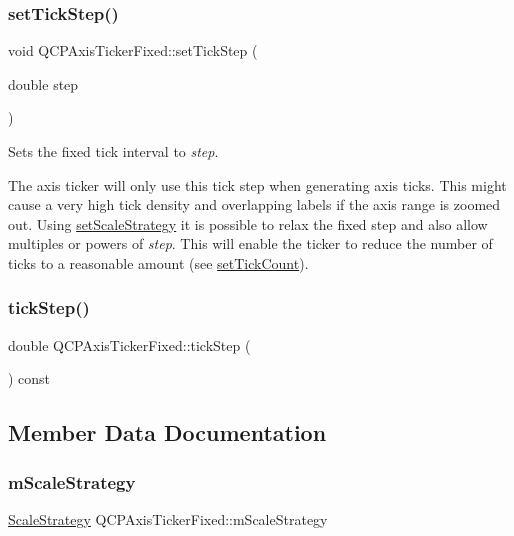 \subsubsection{\texorpdfstring{setTickStep()}{setTickStep()}}
{\footnotesize\ttfamily void Q\+C\+P\+Axis\+Ticker\+Fixed\+::set\+Tick\+Step (\begin{DoxyParamCaption}\item[{double}]{step }\end{DoxyParamCaption})}

Sets the fixed tick interval to {\itshape step}.

The axis ticker will only use this tick step when generating axis ticks. This might cause a very high tick density and overlapping labels if the axis range is zoomed out. Using \mbox{\hyperlink{class_q_c_p_axis_ticker_fixed_acbc7c9bcd80b3dc3edee5f0519d301f6}{set\+Scale\+Strategy}} it is possible to relax the fixed step and also allow multiples or powers of {\itshape step}. This will enable the ticker to reduce the number of ticks to a reasonable amount (see \mbox{\hyperlink{class_q_c_p_axis_ticker_a47752abba8293e6dc18491501ae34008}{set\+Tick\+Count}}). \mbox{\label{class_q_c_p_axis_ticker_fixed_a33d1324c8666b4d5df975dea32ed5a28}} 
\subsubsection{\texorpdfstring{tickStep()}{tickStep()}}
{\footnotesize\ttfamily double Q\+C\+P\+Axis\+Ticker\+Fixed\+::tick\+Step (\begin{DoxyParamCaption}{ }\end{DoxyParamCaption}) const\hspace{0.3cm}{\ttfamily [inline]}}



\subsection{Member Data Documentation}
\mbox{\label{class_q_c_p_axis_ticker_fixed_a61ead1590161769b0d36e09419e67b10}} 
\subsubsection{\texorpdfstring{mScaleStrategy}{mScaleStrategy}}
{\footnotesize\ttfamily \mbox{\hyperlink{class_q_c_p_axis_ticker_fixed_a15b3d38b935d404b1311eb85cfb6a439}{Scale\+Strategy}} Q\+C\+P\+Axis\+Ticker\+Fixed\+::m\+Scale\+Strategy\hspace{0.3cm}{\ttfamily [protected]}}

